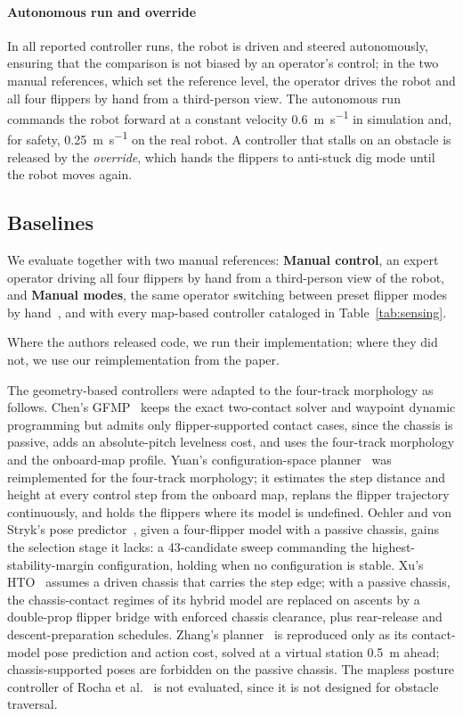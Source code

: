 \paragraph{Autonomous run and \SAS{} override} In all reported controller runs, the robot is driven and steered autonomously, ensuring that the comparison is not biased by an operator's control; in the two manual references, which set the reference level, the operator drives the robot and all four flippers by hand from a third-person view. The autonomous run commands the robot forward at a constant velocity
\SI{0.6}{\metre\per\second} in simulation and, for safety, \SI{0.25}{\metre\per\second}
on the real robot. A controller that stalls on an obstacle is released by the \emph{\SAS{} override}, which
hands the flippers to \SAS{} anti-stuck dig mode until the robot moves again.

\subsection{Baselines}
We evaluate \SAS{} together with two manual references: \textbf{Manual control}, an expert operator driving all four flippers by hand from a
third-person view of the robot, and \textbf{Manual modes}, the same operator switching between preset flipper modes by hand~\cite{azayev2022}, and with every map-based controller cataloged in Table~\ref{tab:sensing}. 

Where the authors released code, we run their implementation; where they did not, we use our reimplementation from the paper.

The geometry-based controllers were adapted to the four-track morphology as follows. Chen's
GFMP~\cite{chen2023} keeps the exact two-contact solver and waypoint dynamic programming but admits only flipper-supported contact cases,
since the chassis is passive, adds an absolute-pitch levelness cost, and uses the
four-track morphology and the onboard-map profile. Yuan's configuration-space
planner~\cite{yuan2019} was reimplemented for the four-track morphology; it estimates the
step distance and height at every control step from the onboard map, replans the flipper trajectory continuously, and holds the flippers where its model is undefined. Oehler and von Stryk's pose predictor~\cite{oehler2024}, given a four-flipper model with a passive chassis, gains the selection stage it lacks: a
43-candidate sweep commanding the highest-stability-margin configuration, holding when
no configuration is stable. Xu's HTO~\cite{xu2024} assumes a driven chassis that carries the step edge; with a passive chassis, the chassis-contact regimes of its hybrid model are replaced on ascents by a double-prop
flipper bridge with enforced chassis clearance, plus rear-release and
descent-preparation schedules. Zhang's planner~\cite{zhang2025} is reproduced only as its
contact-model pose prediction and action cost, solved at a virtual station
\SI{0.5}{\metre} ahead; chassis-supported poses are forbidden on the passive chassis. The mapless posture controller of Rocha
et al.~\cite{rocha2023} is not evaluated, since it is not designed for obstacle traversal.

